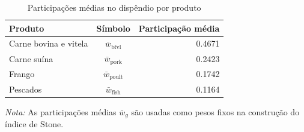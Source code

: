 
\begin{table}[H]
\centering
\caption{Participações médias no dispêndio por produto}
\label{tab:participacoes-medias}
\small
\begin{tabular}{@{}lcr@{}}
\toprule
Produto & Símbolo & Participação média \\
\midrule
Carne bovina e vitela & $\bar{w}_{\text{bfvl}}$ & 0.4671 \\
Carne suína & $\bar{w}_{\text{pork}}$ & 0.2423 \\
Frango & $\bar{w}_{\text{poult}}$ & 0.1742 \\
Pescados & $\bar{w}_{\text{fish}}$ & 0.1164 \\
\bottomrule
\end{tabular}
\par\vspace{0.35em}
\begin{minipage}{0.92\textwidth}\footnotesize \textit{Nota:} As participações médias $\bar{w}_g$ são usadas como pesos fixos na construção do índice de Stone.\end{minipage}
\end{table}
